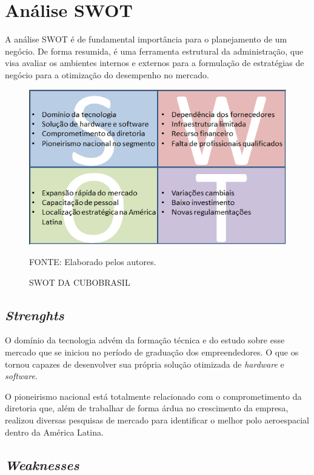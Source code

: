 \documentclass[
	12pt,				%
	openright,			%
	oneside,			%
	a4paper,			%
	english,			%
	french,				%
	spanish,			%
	brazil				%
	]{abntex2}
\begin{document}
\section[Análise SWOT]{Análise SWOT}

	A análise SWOT é de fundamental importância para o planejamento de um negócio. De forma resumida, é uma ferramenta estrutural da administração, que visa avaliar os ambientes internos e externos para a formulação de estratégias de negócio para a otimização do desempenho no mercado.
	
	\begin{figure}[th]
		\caption{SWOT DA CUBOBRASIL}
		\centering
		\includegraphics[width=1.0\linewidth]{./figs/SWOT}
		
		\begin{small}
			FONTE: Elaborado pelos autores.
		\end{small}
	\end{figure}	
	\pagebreak
\subsection[Strenghts]{\textit{Strenghts}}

	O domínio da tecnologia advém da formação técnica e do estudo sobre esse mercado que se iniciou no período de graduação dos empreendedores. O que os tornou capazes de desenvolver sua própria solução otimizada de \textit{hardware} e \textit{software}.
	
	O pioneirismo nacional está totalmente relacionado com o comprometimento da diretoria que, além de trabalhar de forma árdua no crescimento da empresa, realizou diversas pesquisas de mercado para identificar o melhor polo aeroespacial dentro da América Latina.

\subsection[Weaknesses]{\textit{Weaknesses}}
\end{document}
